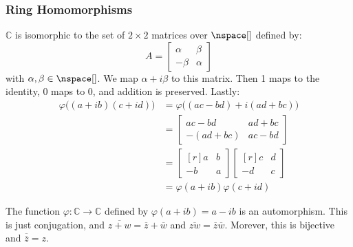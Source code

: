         \subsubsection{Ring Homomorphisms}
            \begin{example}
                $\mathbb{C}$ is isomorphic to the set of $2\times{2}$
                matrices over $\nspace[]$ defined by:
                \begin{equation}
                    A=
                    \begin{bmatrix}
                        \alpha&\beta\\
                        \minus\beta&\alpha
                    \end{bmatrix}
                \end{equation}
                with $\alpha,\beta\in\nspace[]$. We map
                $\alpha+i\beta$ to this matrix. Then 1 maps to the identity,
                0 maps to 0, and addition is preserved. Lastly:
                \begin{subequations}
                    \begin{align}
                        \varphi\big((a+ib)(c+id)\big)
                        &=\varphi\big((ac-bd)+i(ad+bc)\big)\\
                        &=
                        \begin{bmatrix}
                            ac-bd&ad+bc\\
                            \minus(ad+bc)&ac-bd
                        \end{bmatrix}\\
                        &=
                        \begin{bmatrix*}[r]
                            a&b\\
                            \minus{b}&a
                        \end{bmatrix*}
                        \begin{bmatrix*}[r]
                            c&d\\
                            \minus{d}&c
                        \end{bmatrix*}\\
                        &=\varphi(a+ib)\varphi(c+id)
                    \end{align}
                \end{subequations}
            \end{example}
            \begin{example}
                The function $\varphi:\mathbb{C}\rightarrow\mathbb{C}$
                defined by $\varphi(a+ib)=a-ib$ is an automorphism. This is
                just conjugation, and
                $\overline{z+w}=\overline{z}+\overline{w}$ and
                $\overline{zw}=\overline{z}\overline{w}$. Morever, this is
                bijective and $\overline{\overline{z}}=z$.
            \end{example}
